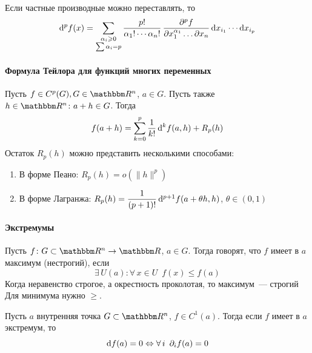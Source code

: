 \documentclass[12pt,trimbord]{../../../notes}
\begin{document}
\begin{stat}\label{stat:diffspace::highdiff::binom}
  Если частные производные можно переставлять, то
  \[
    \mathrm{d}^p f(x) = \sum_{\substack{\alpha_i \geqslant 0 \\ \sum \alpha_i = p}} 
    \frac{p!}{\alpha_1! \dotsm \alpha_n!} \, 
    \frac{\partial^p f}{\partial x_1^{\alpha_1}\dotso \partial x_n} \,\mathrm{d} x_{i_1} \dotsm \mathrm{d} x_{i_p}
  \]
\end{stat}

\paragraph{Формула Тейлора для функций многих переменных}
\label{par:diffspace::taylor}

\begin{thrm}\label{thrm:diffspace::taylor}
  Пусть $f \in C^p(G), G\in \R^n$, $a\in G$. Пусть также $h\in \R^n \colon a+h \in G$.
  Тогда 
  \[
    f(a+h) = \sum_{k=0}^p \frac{1}{k!} \, \mathrm{d}^k f(a,h) + R_p(h)
  \]
  Остаток $R_p(h)$ можно представить несколькими способами:
  \begin{enumerate}
    \item В форме Пеано: $R_p(h) = o(\|h\|^p)$
    \item В форме Лагранжа: $R_p(h) = \dfrac{1}{(p+1)!}\, \mathrm{d}^{p+1} f(a + \theta h, h)$, 
      $\theta \in (0,1)$
  \end{enumerate}

\end{thrm}

\paragraph{Экстремумы}
\label{par:diffspace::extrema}

\begin{defn}\label{defn:diffspace::extrema}
  Пусть $f\colon G \subset \R^n \to \R$, $a\in G$. Тогда говорят, что $f$ имеет в $a$ максимум (нестрогий), если
  \[
    \exists\, U(a) \colon \forall\, x \in U \;\: f(x) \leqslant f(a)
  \]
  Когда неравенство строгое, а окрестность проколотая, то максимум~--- строгий
  Для минимума нужно $\geqslant$.
\end{defn}

\begin{thrm}\label{thrm:diffspace::extrema::ness}
  Пусть $a$ внутренняя точка $G \subset \R^n$, $f\in C^1(a)$. Тогда если $f$ имеет в $a$ экстремум, то
  \[
    \mathrm{d} f(a) = 0 \Leftrightarrow \forall\,i \;\: \partial_i f(a) = 0
  \]
\end{thrm}
\end{document}
